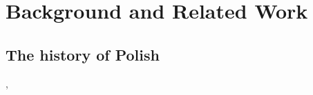 \section{Background and Related Work}
\label{sec:background}

\subsection{The history of Polish}
\label{subsec:history-pl}

\citet{kurzowa_1983},
\citet{długosz-kurczabowa_dubisz_2006}
